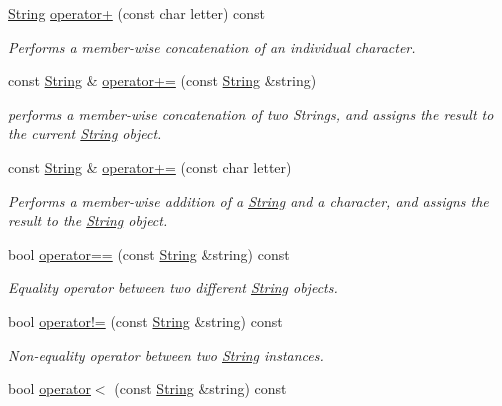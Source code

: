 \begin{DoxyCompactItemize}
\hyperlink{classsparky_1_1_string}{String} \hyperlink{classsparky_1_1_string_a34ecc5e193423ce5a2e83a3a39b719ab}{operator+} (const char letter) const 
\begin{DoxyCompactList}\small\item\em Performs a member-\/wise concatenation of an individual character. \end{DoxyCompactList}\item 
const \hyperlink{classsparky_1_1_string}{String} \& \hyperlink{classsparky_1_1_string_aa70e41d4b42d6eeaa6a11d6f87262172}{operator+=} (const \hyperlink{classsparky_1_1_string}{String} \&string)
\begin{DoxyCompactList}\small\item\em performs a member-\/wise concatenation of two Strings, and assigns the result to the current \hyperlink{classsparky_1_1_string}{String} object. \end{DoxyCompactList}\item 
const \hyperlink{classsparky_1_1_string}{String} \& \hyperlink{classsparky_1_1_string_a7609d00fc965915362ba4a2a513460f1}{operator+=} (const char letter)
\begin{DoxyCompactList}\small\item\em Performs a member-\/wise addition of a \hyperlink{classsparky_1_1_string}{String} and a character, and assigns the result to the \hyperlink{classsparky_1_1_string}{String} object. \end{DoxyCompactList}\item 
bool \hyperlink{classsparky_1_1_string_a6c71fce198a88b0c71caa0b1e18ded20}{operator==} (const \hyperlink{classsparky_1_1_string}{String} \&string) const 
\begin{DoxyCompactList}\small\item\em Equality operator between two different \hyperlink{classsparky_1_1_string}{String} objects. \end{DoxyCompactList}\item 
bool \hyperlink{classsparky_1_1_string_a41e88ee7f7a6df86be4b0ca6e136a69d}{operator!=} (const \hyperlink{classsparky_1_1_string}{String} \&string) const 
\begin{DoxyCompactList}\small\item\em Non-\/equality operator between two \hyperlink{classsparky_1_1_string}{String} instances. \end{DoxyCompactList}\item 
bool \hyperlink{classsparky_1_1_string_af443298e2a1f9d04e042b5400ef56823}{operator$<$} (const \hyperlink{classsparky_1_1_string}{String} \&string) const 

\end{DoxyCompactItemize}
